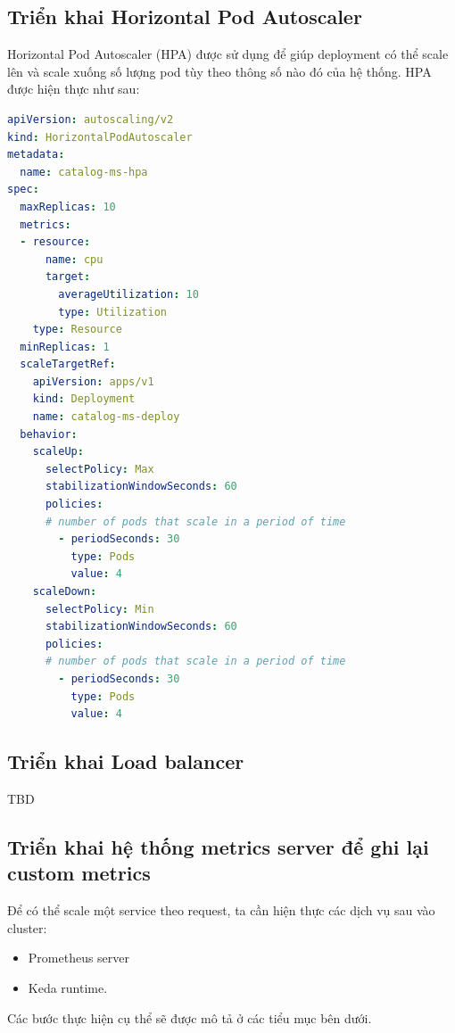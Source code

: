 \subsection{Triển khai Horizontal Pod Autoscaler}
\noindent Horizontal Pod Autoscaler (HPA) được sử dụng để giúp deployment có thể scale lên và scale xuống số lượng pod tùy theo thông số nào đó của hệ thống. HPA được hiện thực như sau:
\begin{lstlisting}[language=yaml]
apiVersion: autoscaling/v2
kind: HorizontalPodAutoscaler
metadata:
  name: catalog-ms-hpa
spec:
  maxReplicas: 10
  metrics:
  - resource:
      name: cpu
      target:
        averageUtilization: 10
        type: Utilization
    type: Resource
  minReplicas: 1
  scaleTargetRef:
    apiVersion: apps/v1
    kind: Deployment
    name: catalog-ms-deploy
  behavior:
    scaleUp:
      selectPolicy: Max
      stabilizationWindowSeconds: 60
      policies:
      # number of pods that scale in a period of time
        - periodSeconds: 30
          type: Pods
          value: 4
    scaleDown:
      selectPolicy: Min
      stabilizationWindowSeconds: 60
      policies:
      # number of pods that scale in a period of time
        - periodSeconds: 30
          type: Pods
          value: 4
\end{lstlisting}
\subsection{Triển khai Load balancer}
\noindent TBD
\subsection{Triển khai hệ thống metrics server để ghi lại custom metrics}
\noindent Để có thể scale một service theo request, ta cần hiện thực các dịch vụ sau vào cluster:
\begin{itemize}
  \item Prometheus server
  \item Keda runtime.
\end{itemize}
Các bước thực hiện cụ thể sẽ được mô tả ở các tiểu mục bên dưới.

